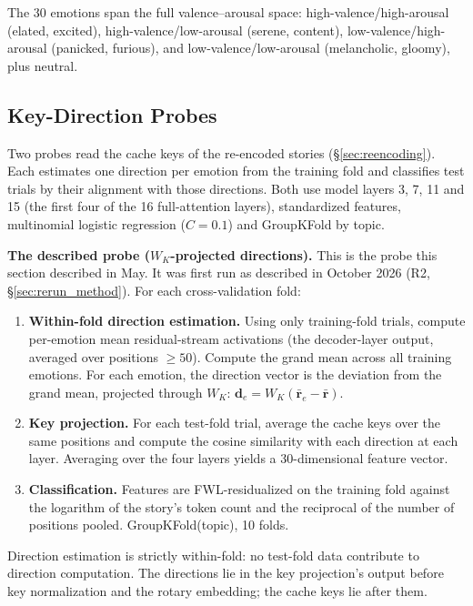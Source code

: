 \documentclass[11pt,a4paper]{article}
\begin{document}
The 30 emotions span the full valence--arousal space: high-valence/high-arousal (elated, excited), high-valence/low-arousal (serene, content), low-valence/high-arousal (panicked, furious), and low-valence/low-arousal (melancholic, gloomy), plus neutral.

\subsection{Key-Direction Probes}
\label{sec:wk_probe_method}

Two probes read the cache keys of the re-encoded stories (\S\ref{sec:reencoding}). Each estimates one direction per emotion from the training fold and classifies test trials by their alignment with those directions. Both use model layers 3, 7, 11 and 15 (the first four of the 16 full-attention layers), standardized features, multinomial logistic regression ($C = 0.1$) and GroupKFold by topic.

\textbf{The described probe ($W_K$-projected directions).} This is the probe this section described in May. It was first run as described in October 2026 (R2, \S\ref{sec:rerun_method}). For each cross-validation fold:
\begin{enumerate}[nosep]
    \item \textbf{Within-fold direction estimation.} Using only training-fold trials, compute per-emotion mean residual-stream activations (the decoder-layer output, averaged over positions $\geq 50$). Compute the grand mean across all training emotions. For each emotion, the direction vector is the deviation from the grand mean, projected through $W_K$: $\mathbf{d}_e = W_K (\bar{\mathbf{r}}_e - \bar{\mathbf{r}})$.
    \item \textbf{Key projection.} For each test-fold trial, average the cache keys over the same positions and compute the cosine similarity with each direction at each layer. Averaging over the four layers yields a 30-dimensional feature vector.
    \item \textbf{Classification.} Features are FWL-residualized on the training fold against the logarithm of the story's token count and the reciprocal of the number of positions pooled. GroupKFold(topic), 10 folds.
\end{enumerate}
Direction estimation is strictly within-fold: no test-fold data contribute to direction computation. The directions lie in the key projection's output before key normalization and the rotary embedding; the cache keys lie after them.
\end{document}
